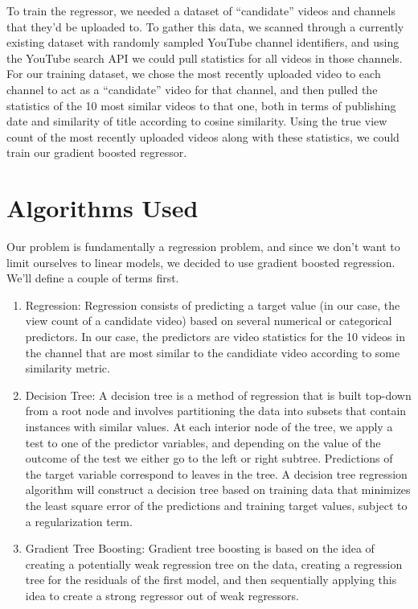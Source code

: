 \documentclass[12pt]{article}
\theoremstyle{definition}
\theoremstyle{remark}
\begin{document}
To train the regressor, we needed a dataset of ``candidate'' videos and
channels that they'd be uploaded to. To gather this data, we scanned through a
currently existing dataset with randomly sampled YouTube channel identifiers,
and using the YouTube search API we could pull statistics for all videos in
those channels. For our training dataset, we chose the most recently
uploaded video to each channel to act as a ``candidate'' video for that channel,
and then pulled the statistics of the 10 most similar videos to that one, both
in terms of publishing date and similarity of title according to cosine similarity.
Using the true view count of the most recently uploaded videos along with these
statistics, we could train our gradient boosted regressor.

\section{Algorithms Used}
Our problem is fundamentally a regression problem, and since we don't want to
limit ourselves to linear models, we decided to use gradient boosted regression.
We'll define a couple of terms first.

\begin{enumerate}
\item Regression: Regression consists of predicting a target value (in our case,
  the view count of a candidate video) based on several numerical or categorical
  predictors. In our case, the predictors are video statistics for the 10 videos
  in the channel that are most similar to the candidiate video according to some
  similarity metric.
\item Decision Tree: A decision tree is a method of regression that is built
  top-down from a root node and involves partitioning the data into subsets that
  contain instances with similar values. At each interior node of the tree, we
  apply a test to one of the predictor variables, and depending on the value of
  the outcome of the test we either go to the left or right subtree. Predictions
  of the target variable correspond to leaves in the tree. A decision tree
  regression algorithm will construct a decision tree based on training data
  that minimizes the least square error of the predictions and training target
  values, subject to a regularization term.
\item Gradient Tree Boosting: Gradient tree boosting is based on the idea of
  creating a potentially weak regression tree on the data, creating a regression
  tree for the residuals of the first model, and then sequentially applying this
  idea to create a strong regressor out of weak regressors.
\end{enumerate}
\end{document}
